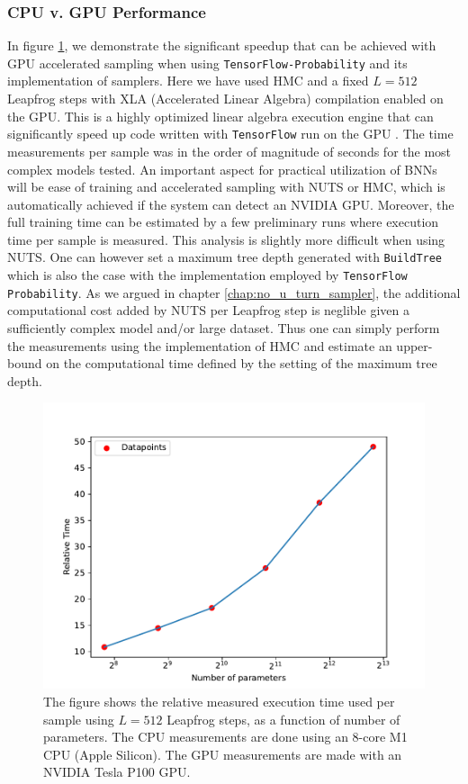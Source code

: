 \subsubsection{CPU v. GPU Performance}
In figure \ref{fig:relative_performance}, we demonstrate the significant speedup that can be achieved
with GPU accelerated sampling when using {\tt TensorFlow-Probability} and its implementation of samplers. Here we have used HMC and a fixed $L = 512$ Leapfrog steps with XLA (Accelerated Linear Algebra) compilation enabled on the GPU. This is a highly optimized linear algebra execution engine that can significantly speed up code written with {\tt TensorFlow} run on the GPU \cite{xla}. The time measurements per sample was in the order of magnitude of seconds for the most complex models
tested. An important aspect for practical utilization of BNNs will be ease of training and accelerated sampling with NUTS or HMC, which is automatically achieved if the system can detect an NVIDIA GPU. Moreover, the full training time can be estimated by a few preliminary runs where execution time per sample is measured. This analysis is slightly more difficult when using NUTS. One can however set a maximum tree depth generated with {\tt BuildTree} which is also the case with the implementation employed by {\tt TensorFlow Probability}. As we argued in chapter \ref{chap:no_u_turn_sampler}, the additional computational cost added by NUTS per Leapfrog step is neglible given a sufficiently complex model and/or large dataset.
Thus one can simply perform the measurements using the implementation of HMC and estimate an upper-bound on the computational time defined by the setting of the maximum tree depth.

\begin{figure}
    \centering
    \includegraphics[scale=0.8]{figures/cpu_vs_gpu/cpu_vs_gpu_performance.pdf}
    \caption{The figure shows the relative measured execution time used per sample using $L = 512$ Leapfrog steps,
    as a function of number of parameters. The CPU measurements are done using an 8-core M1 CPU (Apple Silicon). The GPU measurements
    are made with an NVIDIA Tesla P100 GPU.
    }
    \label{fig:relative_performance}
\end{figure}

